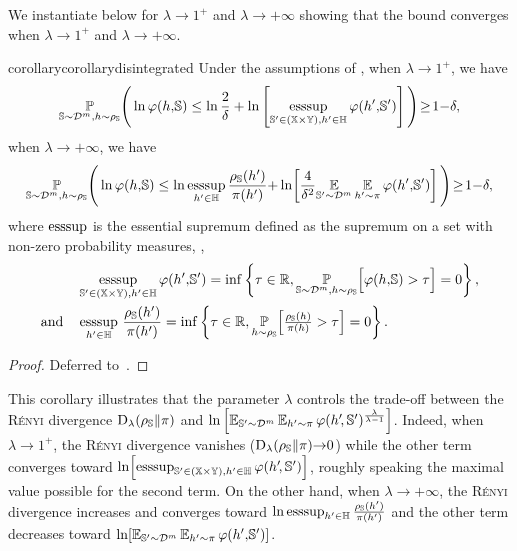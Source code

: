 We instantiate below  for $\lambda{\rightarrow}1^+$ and $\lambda{\rightarrow}{+}{\infty}$ showing that the bound converges when $\lambda{\to}1^+$ and $\lambda{\to}{+}\infty$.
\begin{restatable}{corollary}{corollarydisintegrated}
Under the assumptions of  , when $\lambda{\to}1^+$,  we have
\begin{align*}
   \operatorname*{\mathbb{P}}_{\mathbb{S}\sim\mathcal{D}^{m},h\sim \rho_{\mathbb{S}}}\!\Bigg(
  \ln\varphi(h{,}\mathbb{S}) \le \ln\frac{2}{\delta} + \ln\left[\operatorname*{\text{\rm esssup}}_{\mathbb{S}'\in(\mathbb{X}{\times}\mathbb{Y}), h'\in\mathbb{H}}\varphi(h'{,} \mathbb{S}')\right]
  \Bigg)\!\ge\! 1{-}\delta,
\end{align*}
when $\lambda{\to}+\infty$,
we have
\begin{align*}
 \operatorname*{\mathbb{P}}_{\mathbb{S}\sim\mathcal{D}^{m},h\sim \rho_{\mathbb{S}}}\!\Bigg(    \ln\varphi(h{,} \mathbb{S})\le\ln{\displaystyle\operatorname*{\text{\rm esssup}}_{h'\in\ensuremath{\mathbb{H}}}}\,\frac{\rho_{\mathbb{S}}(h')}{\pi(h')}{+}\ln\!\left[\frac{4}{\delta^2} {\displaystyle \operatorname*{\mathbb{E}}_{\mathbb{S}'{\sim}\mathcal{D}^{m}}\operatorname*{\mathbb{E}}_{h'{\sim}\pi}\varphi(h'{,}\mathbb{S}')}\right] \Bigg)\!\ge\! 1{-}\delta,
\end{align*}
where $\operatorname*{\text{\rm esssup}}$ is the essential supremum defined as the supremum on a set with non-zero probability measures, \ie, 
\begin{align*}
    &\operatorname*{\text{\rm esssup}}_{\mathbb{S}'\in(\mathbb{X}{\times}\mathbb{Y}), h'\in\mathbb{H}}\varphi(h'{,} \mathbb{S}')=\inf\left\{\tau\in\mathbb{R}, \operatorname*{\mathbb{P}}_{\mathbb{S}\sim\mathcal{D}^{m},h\sim \rho_{\mathbb{S}}}\!\Big[ \varphi(h{,} \mathbb{S}) > \tau\Big] = 0\right\},\\
    \text{and}\quad &\operatorname*{\text{\rm esssup}}_{h'\in\mathbb{H}}\,\frac{\rho_{\mathbb{S}}(h')}{\pi(h')}=\inf\left\{\tau\in\mathbb{R}, \operatorname*{\mathbb{P}}_{h\sim\rho_{\mathbb{S}}}\!\Big[ \tfrac{\rho_{\mathbb{S}}(h)}{\pi(h)} > \tau\Big] = 0\right\}.
\end{align*}
\label{chap:dis-pra:corollary:disintegrated}
\end{restatable}
\begin{noaddcontents}\begin{proof}
Deferred to~.
\end{proof}\end{noaddcontents}

This corollary illustrates that the parameter $\lambda$ controls the trade-off between the \textsc{Rényi} divergence 
$\operatorname{D}_{\lambda}(\rho_{\mathbb{S}}\|\pi)$ and 
$\ln\left[\operatorname*{\mathbb{E}}_{\mathbb{S}'{\sim}\mathcal{D}^{m}}\operatorname*{\mathbb{E}}_{h'{\sim}\pi}\varphi(h'\!, \mathbb{S}')^{\frac{\lambda}{\lambda{-}1}}\right]$. 
Indeed, when $\lambda{\rightarrow}1^+$, the \textsc{Rényi} divergence vanishes ($\operatorname{D}_{\lambda}(\rho_{\mathbb{S}}\|\pi){\to}0$) while the other term converges toward $\ln\!\left[\operatorname*{\text{\rm esssup}}_{\mathbb{S}'\in(\mathbb{X}{\times}\mathbb{Y}), h'\in\mathbb{H}}\varphi(h'\!, \mathbb{S}')\right]$, roughly speaking the maximal value possible for the second term.
On the other hand, when $\lambda{\rightarrow}{+}\infty$, the \textsc{Rényi} divergence increases and converges toward $\ln\operatorname*{\text{\rm esssup}}_{h'\in\mathbb{H}}\frac{\rho_{\mathbb{S}}(h')}{\pi(h')}$ and the other term decreases toward $\ln\!\left[\operatorname*{\mathbb{E}}_{\mathbb{S}'{\sim}\mathcal{D}^{m}}\operatorname*{\mathbb{E}}_{h'{\sim}\pi}\varphi(h'{,}\mathbb{S}')\right]$.

